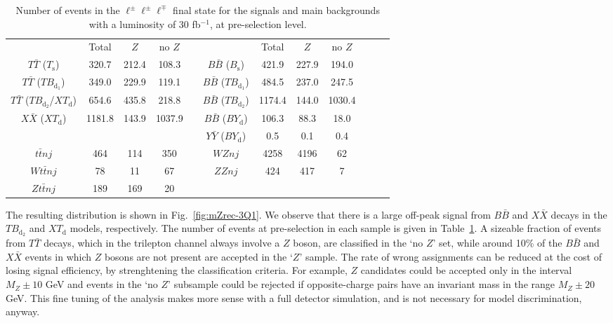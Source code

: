 \documentclass[12pt,a4paper]{article}
\newcommand{\TT}{T \bar T}
\newcommand{\BB}{B \bar B}
\newcommand{\XX}{X \bar X}
\newcommand{\YY}{Y \bar Y}
\newcommand{\Ts}{T_\text{s}}
\newcommand{\Bs}{B_\text{s}}
\newcommand{\TBd}{TB_{\text{d}_1}}
\newcommand{\TBD}{TB_{\text{d}_2}}
\newcommand{\XTd}{XT_\text{d}}
\newcommand{\BYd}{BY_\text{d}}
\begin{document}
\begin{table}[h]
\begin{center}
\begin{tabular}{cccccccccccc}
               & Total  & $Z$   & no $Z$ & \quad &          & Total & $Z$ & no $Z$ \\[1mm]
$\TT$ ($\Ts$)  & 320.7  & 212.4 & 108.3  & & $\BB$ ($\Bs$)  & 421.9 & 227.9 & 194.0 \\
$\TT$ ($\TBd$) & 349.0  & 229.9 & 119.1  & & $\BB$ ($\TBd$) & 484.5 & 237.0 & 247.5 \\
$\TT$ ($\TBD$/$\XTd$) & 654.6  & 435.8 & 218.8  & & $\BB$ ($\TBD$) & 1174.4 & 144.0 & 1030.4 \\
$\XX$ ($\XTd$) & 1181.8 & 143.9 & 1037.9 & & $\BB$ ($\BYd$) & 106.3 & 88.3 & 18.0 \\
               &        &       &        & & $\YY$ ($\BYd$) & 0.5   & 0.1  & 0.4 \\
\hline
$t \bar t nj$  & 464    & 114   & 350    & & $WZnj$         & 4258  & 4196 & 62  \\
$W t \bar tnj$ & 78     & 11    & 67     & & $ZZnj$         & 424   &  417 & 7  \\
$Z t \bar tnj$ & 189    & 169   & 20      \\
\end{tabular}
\end{center}
\caption{Number of events in the $\ell^\pm \ell^\pm \ell^\mp $ final state for
the signals and main backgrounds with a luminosity of 30 fb$^{-1}$, at pre-selection level.}
\label{tab:nsnb-3Q1}
\end{table}
%
The resulting distribution is shown in Fig.~\ref{fig:mZrec-3Q1}. 
We observe that there is a large off-peak signal from $B \bar B$ and $X \bar X$ decays in the $\TBD$ and $\XTd$ models, respectively. The number of events at pre-selection in each sample is given in Table~\ref{tab:nsnb-3Q1}.
A sizeable fraction of events from $\TT$ decays, which in the trilepton channel always involve a $Z$ boson, are classified in the `no $Z$' set, while around 10\% of the $\BB$ and $\XX$ events in which $Z$ bosons are not present are accepted in the `$Z$' sample. The rate of wrong assignments can be reduced at the cost of losing signal efficiency, by strenghtening the classification criteria. For example, $Z$ candidates could be accepted only in the interval $M_Z \pm 10$ GeV and  events in the `no $Z$' subsample could be rejected if opposite-charge pairs have an invariant mass in the range $M_Z \pm 20$ GeV. This fine tuning of the analysis makes more sense with a full detector simulation, and is not necessary for model discrimination, anyway.
\end{document}
